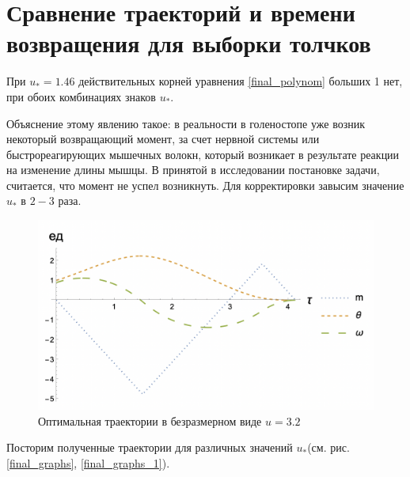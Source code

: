 \documentclass[a4paper,12pt, openany]{book}
\theoremstyle{plain} %
\theoremstyle{definition} %
\theoremstyle{remark} %
\numberwithin{equation}{chapter}
\begin{document}
{\section{Сравнение траекторий и времени возвращения для выборки толчков}


При $u_\ast=1.46$ действительных корней уравнения \eqref{final_polynom} больших 1 нет,
при обоих комбинациях знаков $u_\ast$.

Объяснение этому явлению такое: в реальности в голеностопе уже возник некоторый возвращающий момент, за счет нервной системы или быстрореагирующих мышечных волокн,
 который возникает в результате реакции на изменение длины мышцы.
В принятой в исследовании постановке задачи, считается, что момент не успел возникнуть. Для корректировки завысим значение $u_\ast$ в $2-3$ раза.

\begin{figure}[h!]
    \centering
    \includegraphics[width=0.7\linewidth]{3_graphs.png}
    \caption{Оптимальная траектории в безразмерном виде $u=3.2$ }
    \label{3_graphs}
\end{figure}

Посторим полученные траектории для различных значений $u_\ast$(см. рис. \ref{final_graphs}, \ref{final_graphs_1}).

}
\end{document}

